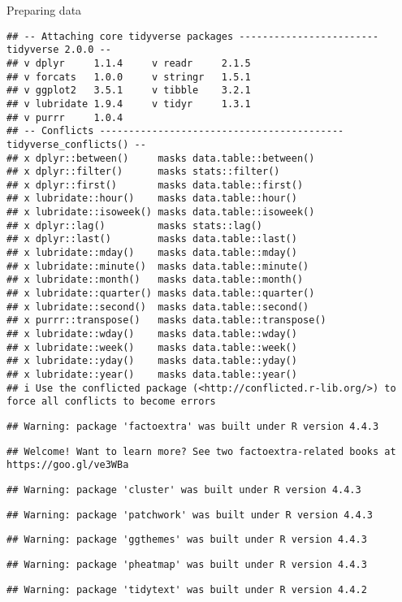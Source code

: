 \documentclass[
  ignorenonframetext,
]{beamer}
\begin{document}
\begin{frame}[fragile]{Preparing data}
\begin{verbatim}
## -- Attaching core tidyverse packages ------------------------ tidyverse 2.0.0 --
## v dplyr     1.1.4     v readr     2.1.5
## v forcats   1.0.0     v stringr   1.5.1
## v ggplot2   3.5.1     v tibble    3.2.1
## v lubridate 1.9.4     v tidyr     1.3.1
## v purrr     1.0.4     
## -- Conflicts ------------------------------------------ tidyverse_conflicts() --
## x dplyr::between()     masks data.table::between()
## x dplyr::filter()      masks stats::filter()
## x dplyr::first()       masks data.table::first()
## x lubridate::hour()    masks data.table::hour()
## x lubridate::isoweek() masks data.table::isoweek()
## x dplyr::lag()         masks stats::lag()
## x dplyr::last()        masks data.table::last()
## x lubridate::mday()    masks data.table::mday()
## x lubridate::minute()  masks data.table::minute()
## x lubridate::month()   masks data.table::month()
## x lubridate::quarter() masks data.table::quarter()
## x lubridate::second()  masks data.table::second()
## x purrr::transpose()   masks data.table::transpose()
## x lubridate::wday()    masks data.table::wday()
## x lubridate::week()    masks data.table::week()
## x lubridate::yday()    masks data.table::yday()
## x lubridate::year()    masks data.table::year()
## i Use the conflicted package (<http://conflicted.r-lib.org/>) to force all conflicts to become errors
\end{verbatim}

\begin{verbatim}
## Warning: package 'factoextra' was built under R version 4.4.3
\end{verbatim}

\begin{verbatim}
## Welcome! Want to learn more? See two factoextra-related books at https://goo.gl/ve3WBa
\end{verbatim}

\begin{verbatim}
## Warning: package 'cluster' was built under R version 4.4.3
\end{verbatim}

\begin{verbatim}
## Warning: package 'patchwork' was built under R version 4.4.3
\end{verbatim}

\begin{verbatim}
## Warning: package 'ggthemes' was built under R version 4.4.3
\end{verbatim}

\begin{verbatim}
## Warning: package 'pheatmap' was built under R version 4.4.3
\end{verbatim}

\begin{verbatim}
## Warning: package 'tidytext' was built under R version 4.4.2
\end{verbatim}
\end{frame}
\end{document}
